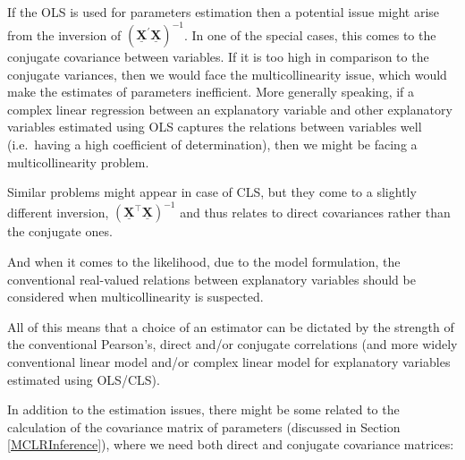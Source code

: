 \documentclass[
]{book}
\begin{document}
If the OLS is used for parameters estimation then a potential issue might arise from the inversion of \(\left( \underline{\mathbf{X}}^\prime \underline{\mathbf{X}}\right)^{-1}\). In one of the special cases, this comes to the conjugate covariance between variables. If it is too high in comparison to the conjugate variances, then we would face the multicollinearity issue, which would make the estimates of parameters inefficient. More generally speaking, if a complex linear regression between an explanatory variable and other explanatory variables estimated using OLS captures the relations between variables well (i.e.~having a high coefficient of determination), then we might be facing a multicollinearity problem.

Similar problems might appear in case of CLS, but they come to a slightly different inversion, \(\left( \underline{\mathbf{X}}^\top \underline{\mathbf{X}}\right)^{-1}\) and thus relates to direct covariances rather than the conjugate ones.

And when it comes to the likelihood, due to the model formulation, the conventional real-valued relations between explanatory variables should be considered when multicollinearity is suspected.

All of this means that a choice of an estimator can be dictated by the strength of the conventional Pearson's, direct and/or conjugate correlations (and more widely conventional linear model and/or complex linear model for explanatory variables estimated using OLS/CLS).

In addition to the estimation issues, there might be some related to the calculation of the covariance matrix of parameters (discussed in Section \ref{MCLRInference}), where we need both direct and conjugate covariance matrices:
\end{document}
